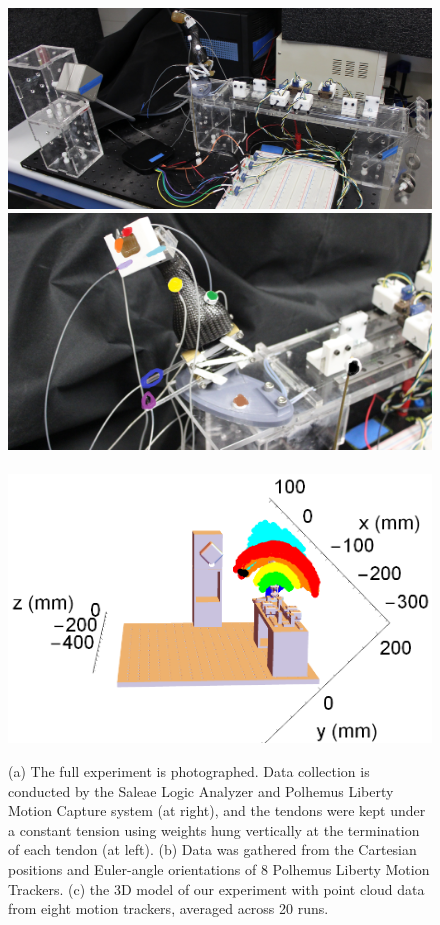 \documentclass[letterpaper, 10 pt, conference]{ieeeconf}
\begin{document}
\begin{figure}
    \vspace{6pt}
	\centering
    {\includegraphics[width = 1\columnwidth]{Figures/overview2v2.JPG}\label{schem}}\\
    {\includegraphics[width = 1\columnwidth]{Figures/D6_v2.JPG}\label{contract}}\\
	\\
	{\includegraphics[width = .8\columnwidth]{Figures/F5_v2.PNG}\label{schem2}}\\

	
	\caption{(a) The full experiment is photographed. Data collection is conducted by the Saleae Logic Analyzer and Polhemus Liberty Motion Capture system (at right), and the tendons were kept under a constant tension using weights hung vertically at the termination of each tendon (at left). (b) Data was gathered from the Cartesian positions and Euler-angle orientations of 8 Polhemus Liberty Motion Trackers. (c) the 3D model of our experiment with point cloud data from eight motion trackers, averaged across 20 runs.}\label{workspaces}
\vspace{-6pt}
\end{figure}
\end{document}
